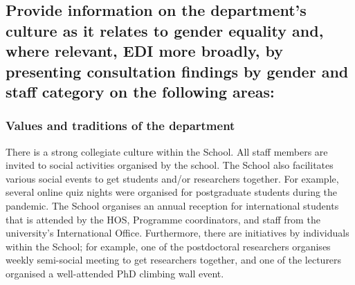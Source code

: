 \subsection{Provide information on the department’s culture as it relates to gender equality and, where relevant, EDI more broadly, by presenting consultation findings by gender and staff category on the following areas:}

\subsubsection{Values and traditions of the department}
There is a strong collegiate culture within the School. 
All staff members are invited to social activities organised by the school. %
The School also facilitates various social events to get students and/or researchers together. For example, several online quiz nights were organised for postgraduate students during the pandemic. The School organises an annual reception for international students that is attended by the \ac{HOS}, Programme coordinators, and staff from the university's International Office. Furthermore, there are initiatives by individuals within the School; for example, one of the postdoctoral researchers organises weekly semi-social meeting to get researchers together, and one of the lecturers organised a well-attended PhD climbing wall event.

